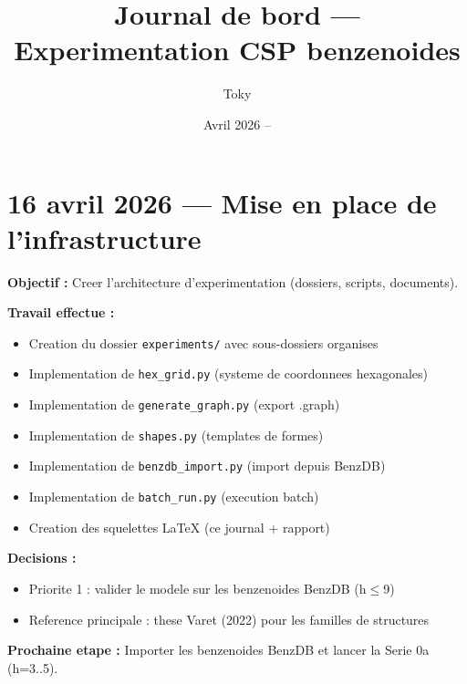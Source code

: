 \documentclass[a4paper,11pt]{article}
\title{Journal de bord --- Experimentation CSP benzenoides}
\author{Toky}
\date{Avril 2026 --}
\begin{document}
\maketitle

\tableofcontents
\newpage

\section*{16 avril 2026 --- Mise en place de l'infrastructure}

\textbf{Objectif :} Creer l'architecture d'experimentation (dossiers, scripts, documents).

\textbf{Travail effectue :}
\begin{itemize}
    \item Creation du dossier \texttt{experiments/} avec sous-dossiers organises
    \item Implementation de \texttt{hex\_grid.py} (systeme de coordonnees hexagonales)
    \item Implementation de \texttt{generate\_graph.py} (export .graph)
    \item Implementation de \texttt{shapes.py} (templates de formes)
    \item Implementation de \texttt{benzdb\_import.py} (import depuis BenzDB)
    \item Implementation de \texttt{batch\_run.py} (execution batch)
    \item Creation des squelettes LaTeX (ce journal + rapport)
\end{itemize}

\textbf{Decisions :}
\begin{itemize}
    \item Priorite 1 : valider le modele sur les benzenoides BenzDB (h$\leq$9)
    \item Reference principale : these Varet (2022) pour les familles de structures
\end{itemize}

\textbf{Prochaine etape :} Importer les benzenoides BenzDB et lancer la Serie 0a (h=3..5).

\end{document}
